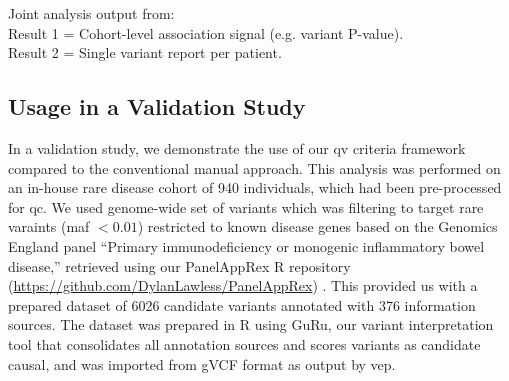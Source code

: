 \begin{tcolorbox}[
    colback=white!0,
    colframe=black,
    boxrule=1pt,
    arc=1mm,
    outer arc=1mm,
    title=\textbf{\refstepcounter{myboxcounter}\label{box:pipe}Box \themyboxcounter: Example diagrammatic representation}
]
\medskip

Joint analysis output from:\\
Result 1 = Cohort-level association signal (e.g. variant P-value).\\
Result 2 = Single variant report per patient.
\end{tcolorbox}

\subsection{Usage in a Validation Study}

In a validation study, we demonstrate the use of our \ac{qv} criteria framework 
compared to the conventional manual approach. 
This analysis was performed on an in-house rare disease cohort of 940 individuals, which had been pre-processed for \ac{qc}. %
We used genome-wide set of variants which was filtering to target rare varaints (\ac{maf} $< 0.01$) restricted to known disease genes based on the Genomics England panel ``Primary immunodeficiency or monogenic inflammatory bowel disease,'' retrieved using our PanelAppRex R repository (\url{https://github.com/DylanLawless/PanelAppRex}) 
\cite{lawless_panelapprex_2025}. 
This provided us with a prepared dataset of 6026 candidate variants annotated with 376 information sources.
The dataset was prepared in R using GuRu, our variant interpretation tool that consolidates all annotation sources and scores variants as candidate causal, and was imported from gVCF format as output by \ac{vep}.

